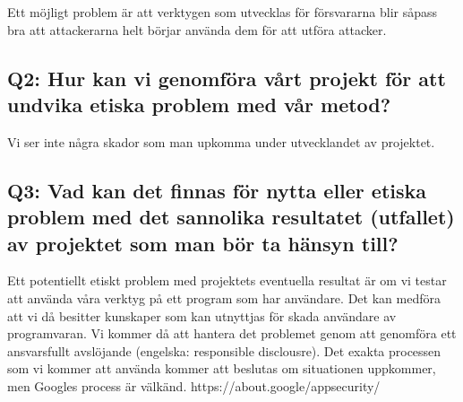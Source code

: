 Ett möjligt problem är att verktygen som utvecklas för försvararna blir såpass bra att attackerarna helt börjar använda dem för att utföra attacker.

\subsection{Q2: Hur kan vi genomföra vårt projekt för att undvika etiska problem med vår metod?}


Vi ser inte några skador som man upkomma under utvecklandet av projektet.

\subsection{Q3: Vad kan det finnas för nytta eller etiska problem med det sannolika resultatet (utfallet) av projektet som man bör ta hänsyn till?}


Ett potentiellt etiskt problem med projektets eventuella resultat är om vi testar att använda våra verktyg på ett program som har användare.
Det kan medföra att vi då besitter kunskaper som kan utnyttjas för skada användare av programvaran.
Vi kommer då att hantera det problemet genom att genomföra ett ansvarsfullt avslöjande (engelska: responsible disclousre).
Det exakta processen som vi kommer att använda kommer att beslutas om situationen uppkommer, men Googles process är välkänd. https://about.google/appsecurity/

